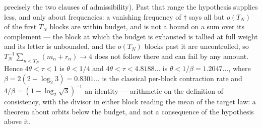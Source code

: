 \documentclass[11pt]{article}
\theoremstyle{remark}
\newcommand{\LL}{\log_2 3}
\begin{document}
precisely the two clauses of admissibility). Past that range the hypothesis
supplies less, and only about frequencies: a vanishing frequency of $\dagger$ says
all but $o(T_N)$ of the first $T_N$ blocks are within budget, and is not a bound on
a sum over its complement --- the block at which the budget is exhausted is tallied
at full weight and its letter is unbounded, and the $o(T_N)$ blocks past it are
uncontrolled, so $T_N^{-1}\sum_{n<T_N}(m_n+r_n) \to 4$ does not follow there and
can fail by any amount. Hence $4\theta < \tau < 1$ is $\theta < 1/4$ and
$4\theta < \tau < 4.8188\ldots$ is $\theta < 1/\beta = 1.2047\ldots$, where
$\beta = 2(2-\LL) = 0.8301\ldots$ is the classical per-block contraction rate and
$4/\beta = (1-\log_2\sqrt3)^{-1}$ an identity --- arithmetic on the definition of
consistency, with the divisor in either block reading the mean of the target law:
a theorem about orbits below the budget, and not a consequence of the hypothesis
above it.
\end{document}
